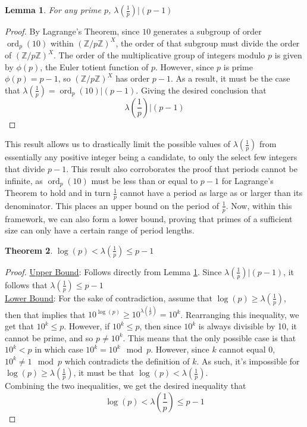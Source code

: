 \documentclass[12pt]{amsart}
\newtheorem{theorem}{Theorem}[section]
\newtheorem{lemma}[theorem]{Lemma}
\theoremstyle{definition}
\theoremstyle{remark}
\newcommand{\ord}{\operatorname{ord}}
\begin{document}
\begin{lemma} \label{lem:lagrange_divisibility}
    For any prime $p$, $\lambda(\frac{1}{p}) | (p-1)$
\end{lemma}
\begin{proof}
    By Lagrange's Theorem, since $10$ generates a subgroup of order $\ord_p(10)$ within $(\mathbb{Z}/p\mathbb{Z})^X$, the order of that subgroup must divide the order of $(\mathbb{Z}/p\mathbb{Z})^X$. The order of the multiplicative group of integers modulo $p$ is given by $\phi(p)$, the Euler totient function of $p$. However, since $p$ is prime $\phi(p)=p-1$, so $(\mathbb{Z}/p\mathbb{Z})^X$ has order $p-1$. As a result, it must be the case that $\lambda(\frac{1}{p})=\ord_p(10)|(p-1)$. Giving the desired conclusion that $$\lambda(\frac{1}{p}) | (p-1)$$
\end{proof}

This result allows us to drastically limit the possible values of $\lambda(\frac{1}{p})$ from essentially any positive integer being a candidate, to only the select few integers that divide $p-1$. This result also corroborates the proof that periods cannot be infinite, as $\ord_p(10)$ must be less than or equal to $p-1$ for Lagrange's Theorem to hold and in turn $\frac{1}{p}$ cannot have a period as large as or larger than its denominator. This places an upper bound on the period of $\frac{1}{p}$. Now, within this framework, we can also form a lower bound, proving that primes of a sufficient size can only have a certain range of period lengths.

\begin{theorem} \label{thm:period_bounds}
    $\log(p) < \lambda(\frac{1}{p})\leq p-1$
\end{theorem}
\begin{proof}
    \underline{Upper Bound}: Follows directly from Lemma \ref{lem:lagrange_divisibility}. Since $\lambda(\frac{1}{p}) | (p-1)$, it follows that $\lambda(\frac{1}{p})\leq p-1$ \\
    \underline{Lower Bound}: For the sake of contradiction, assume that $\log(p) \geq \lambda(\frac{1}{p})$, then that implies that $10^{\log(p)} \geq 10^{\lambda(\frac{1}{p})}=10^k$. Rearranging this inequality, we get that $10^k\leq p$. However, if $10^k\leq p$, then since $10^k$ is always divisible by 10, it cannot be prime, and so $ p\neq 10^k$. This means that the only possible case is that $10^k< p$ in which case $10^k=10^k\mod{p}$. However, since $k$ cannot equal $0$, $10^k\neq1\mod{p}$ which contradicts the definition of $k$. As such, it's impossible for $\log(p) \geq \lambda(\frac{1}{p})$, it must be that $\log(p) < \lambda(\frac{1}{p})$.\\
    
    Combining the two inequalities, we get the desired inequality that $$\log(p) < \lambda(\frac{1}{p})\leq p-1$$
\end{proof}
\end{document}
